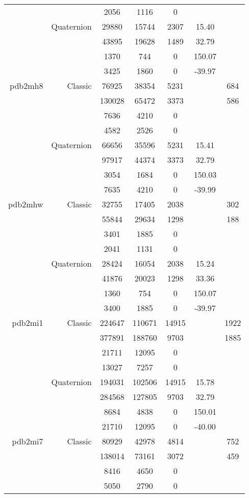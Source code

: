 \begin{xltabular}{\textwidth}{r|rcccSc}
& & 2056 & 1116 & 0 & & \\
& Quaternion & 29880 & 15744 & 2307 & 15.40 & \\
& & 43895 & 19628 & 1489 & 32.79 & \\
& & 1370 & 744 & 0 & 150.07 & \\
& & 3425 & 1860 & 0 & -39.97 & \\ \addlinespace
pdb2mh8 & Classic & 76925 & 38354 & 5231 & & 684 \\
& & 130028 & 65472 & 3373 & & 586 \\
& & 7636 & 4210 & 0 & & \\
& & 4582 & 2526 & 0 & & \\
& Quaternion & 66656 & 35596 & 5231 & 15.41 & \\
& & 97917 & 44374 & 3373 & 32.79 & \\
& & 3054 & 1684 & 0 & 150.03 & \\
& & 7635 & 4210 & 0 & -39.99 & \\ \addlinespace
pdb2mhw & Classic & 32755 & 17405 & 2038 & & 302 \\
& & 55844 & 29634 & 1298 & & 188 \\
& & 3401 & 1885 & 0 & & \\
& & 2041 & 1131 & 0 & & \\
& Quaternion & 28424 & 16054 & 2038 & 15.24 & \\
& & 41876 & 20023 & 1298 & 33.36 & \\
& & 1360 & 754 & 0 & 150.07 & \\
& & 3400 & 1885 & 0 & -39.97 & \\ \addlinespace
pdb2mi1 & Classic & 224647 & 110671 & 14915 & & 1922 \\
& & 377891 & 188760 & 9703 & & 1885 \\
& & 21711 & 12095 & 0 & & \\
& & 13027 & 7257 & 0 & & \\
& Quaternion & 194031 & 102506 & 14915 & 15.78 & \\
& & 284568 & 127805 & 9703 & 32.79 & \\
& & 8684 & 4838 & 0 & 150.01 & \\
& & 21710 & 12095 & 0 & -40.00 & \\ \addlinespace
pdb2mi7 & Classic & 80929 & 42978 & 4814 & & 752 \\
& & 138014 & 73161 & 3072 & & 459 \\
& & 8416 & 4650 & 0 & & \\
& & 5050 & 2790 & 0 & & \\

\end{xltabular}
